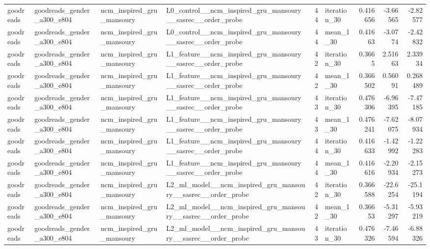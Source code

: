 \begin{table}[htbp!]
\begin{tabular}{llllrlrrr}
goodreads & goodreads\_gender\_a300\_e804 & ncm\_inspired\_gru\_mansoury & L0\_control\_\_ncm\_inspired\_gru\_mansoury\_\_sasrec\_\_order\_probe & 44 & iteration\_30 & 0.416656 & -3.66565 & -2.82577 \\
goodreads & goodreads\_gender\_a300\_e804 & ncm\_inspired\_gru\_mansoury & L0\_control\_\_ncm\_inspired\_gru\_mansoury\_\_sasrec\_\_order\_probe & 44 & mean\_1\_30 & 0.41663 & -3.0774 & -2.42832 \\
goodreads & goodreads\_gender\_a300\_e804 & ncm\_inspired\_gru\_mansoury & L1\_feature\_\_ncm\_inspired\_gru\_mansoury\_\_sasrec\_\_order\_probe & 42 & iteration\_30 & 0.3665 & 2.51663 & 2.33934 \\
goodreads & goodreads\_gender\_a300\_e804 & ncm\_inspired\_gru\_mansoury & L1\_feature\_\_ncm\_inspired\_gru\_mansoury\_\_sasrec\_\_order\_probe & 42 & mean\_1\_30 & 0.366502 & 0.56091 & 0.268489 \\
goodreads & goodreads\_gender\_a300\_e804 & ncm\_inspired\_gru\_mansoury & L1\_feature\_\_ncm\_inspired\_gru\_mansoury\_\_sasrec\_\_order\_probe & 43 & iteration\_30 & 0.476306 & -6.96395 & -7.47185 \\
goodreads & goodreads\_gender\_a300\_e804 & ncm\_inspired\_gru\_mansoury & L1\_feature\_\_ncm\_inspired\_gru\_mansoury\_\_sasrec\_\_order\_probe & 43 & mean\_1\_30 & 0.476241 & -7.62075 & -8.07934 \\
goodreads & goodreads\_gender\_a300\_e804 & ncm\_inspired\_gru\_mansoury & L1\_feature\_\_ncm\_inspired\_gru\_mansoury\_\_sasrec\_\_order\_probe & 44 & iteration\_30 & 0.416633 & -1.42992 & -1.22283 \\
goodreads & goodreads\_gender\_a300\_e804 & ncm\_inspired\_gru\_mansoury & L1\_feature\_\_ncm\_inspired\_gru\_mansoury\_\_sasrec\_\_order\_probe & 44 & mean\_1\_30 & 0.416616 & -2.20934 & -2.15273 \\
goodreads & goodreads\_gender\_a300\_e804 & ncm\_inspired\_gru\_mansoury & L2\_ml\_model\_\_ncm\_inspired\_gru\_mansoury\_\_sasrec\_\_order\_probe & 42 & iteration\_30 & 0.366588 & -22.6254 & -25.1194 \\
goodreads & goodreads\_gender\_a300\_e804 & ncm\_inspired\_gru\_mansoury & L2\_ml\_model\_\_ncm\_inspired\_gru\_mansoury\_\_sasrec\_\_order\_probe & 42 & mean\_1\_30 & 0.36653 & -5.31297 & -5.93219 \\
goodreads & goodreads\_gender\_a300\_e804 & ncm\_inspired\_gru\_mansoury & L2\_ml\_model\_\_ncm\_inspired\_gru\_mansoury\_\_sasrec\_\_order\_probe & 43 & iteration\_30 & 0.476326 & -7.46594 & -6.88326 \\

\end{tabular}
\end{table}

